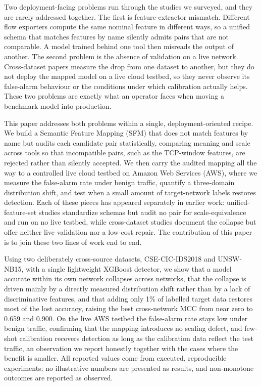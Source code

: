 \documentclass[11pt,a4paper]{article}
\begin{document}
Two deployment-facing problems run through the studies we surveyed, and they are rarely
addressed together. The first is feature-extractor mismatch. Different flow exporters
compute the same nominal feature in different ways, so a unified schema that matches
features by name silently admits pairs that are not comparable. A model trained behind
one tool then misreads the output of another. The second problem is the absence of
validation on a live network. Cross-dataset papers measure the drop from one dataset to
another, but they do not deploy the mapped model on a live cloud testbed, so they never
observe its false-alarm behaviour or the conditions under which calibration actually
helps. These two problems are exactly what an operator faces when moving a benchmark
model into production.

This paper addresses both problems within a single, deployment-oriented recipe. We build
a Semantic Feature Mapping (SFM) that does not match features by name but audits each
candidate pair statistically, comparing meaning and scale across tools so that
incompatible pairs, such as the TCP-window features, are rejected rather than silently
accepted. We then carry the audited mapping all the way to a controlled live cloud
testbed on Amazon Web Services (AWS), where we measure the false-alarm rate under benign
traffic, quantify a three-domain distribution shift, and test when a small amount of
target-network labels restores detection. Each of these pieces has appeared separately
in earlier work: unified-feature-set studies \cite{sarhan} standardize schemas but audit
no pair for scale-equivalence and run on no live testbed, while cross-dataset studies
\cite{cantone,dhooge,verkerken} document the collapse but offer neither live validation
nor a low-cost repair. The contribution of this paper is to join these two lines of work
end to end.

Using two deliberately cross-source datasets, CSE-CIC-IDS2018 and UNSW-NB15, with a
single lightweight XGBoost detector, we show that a model accurate within its own network
collapses across networks, that the collapse is driven mainly by a directly measured
distribution shift rather than by a lack of discriminative features, and that adding only
1\% of labelled target data restores most of the lost accuracy, raising the best
cross-network MCC from near zero to 0.659 and 0.900. On the live AWS testbed the
false-alarm rate stays low under benign traffic, confirming that the mapping introduces
no scaling defect, and few-shot calibration recovers detection as long as the calibration
data reflect the test traffic, an observation we report honestly together with the cases
where the benefit is smaller. All reported values come from executed, reproducible
experiments; no illustrative numbers are presented as results, and non-monotone outcomes
are reported as observed.
\end{document}
